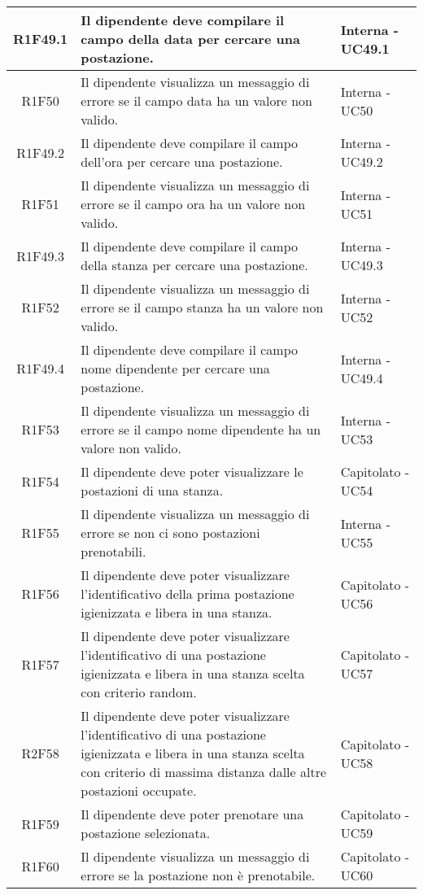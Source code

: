 \begin{center}
\begin{longtable}{|c|p{10cm}|p{4cm}|}
		\hline
		R1F49.1&Il dipendente deve compilare il campo della data per cercare una postazione.	&Interna - UC49.1	\\
		\hline
		R1F50&Il dipendente visualizza un messaggio di errore se il campo data ha un valore non valido.	&Interna - UC50	\\
		\hline
		R1F49.2&Il dipendente deve compilare il campo dell'ora per cercare una postazione.	&Interna - UC49.2	\\
		\hline
		R1F51&Il dipendente visualizza un messaggio di errore se il campo ora ha un valore non valido.	&Interna - UC51	\\
		\hline
		R1F49.3&Il dipendente deve compilare il campo della stanza per cercare una postazione.		&Interna - UC49.3	\\
		\hline
		R1F52&Il dipendente visualizza un messaggio di errore se il campo stanza ha un valore non valido.	&Interna - UC52	\\
		\hline
		R1F49.4&Il dipendente deve compilare il campo nome dipendente per cercare una postazione.	&Interna - UC49.4	\\
		\hline
		R1F53&Il dipendente visualizza un messaggio di errore se il campo nome dipendente ha un valore non valido.	&Interna - UC53	\\
		\hline
		R1F54&Il dipendente deve poter visualizzare le postazioni di una stanza.	&Capitolato - UC54	\\
		\hline
		R1F55&Il dipendente visualizza un messaggio di errore se non ci sono postazioni prenotabili.	&Interna - UC55	\\
		\hline
		R1F56&Il dipendente deve poter visualizzare l'identificativo della prima postazione igienizzata e libera in una stanza.	&Capitolato - UC56	\\
		\hline
		R1F57&Il dipendente deve poter visualizzare l'identificativo di una postazione igienizzata e libera in una stanza scelta con criterio random.	&Capitolato - UC57	\\
		\hline
		R2F58&Il dipendente deve poter visualizzare l'identificativo di una postazione igienizzata e libera in una stanza scelta con criterio di massima distanza dalle altre postazioni occupate.	&Capitolato - UC58	\\
		\hline
		R1F59&Il dipendente deve poter prenotare una postazione selezionata.	&Capitolato - UC59	\\
		\hline
		R1F60&Il dipendente visualizza un messaggio di errore se la postazione non è prenotabile.	&Capitolato - UC60	\\
		\hline

\end{longtable}
\end{center}
